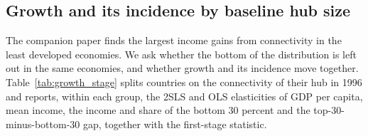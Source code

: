 \subsection{Growth and its incidence by baseline hub size}
\label{sec:growthstage}
The companion paper finds the largest income gains from connectivity in the least developed economies. We ask whether the bottom of the distribution is left out in the same economies, and whether growth and its incidence move together. Table~\ref{tab:growth_stage} splits countries on the connectivity of their hub in 1996 and reports, within each group, the 2SLS and OLS elasticities of GDP per capita, mean income, the income and share of the bottom 30 percent and the top-30-minus-bottom-30 gap, together with the first-stage statistic.

